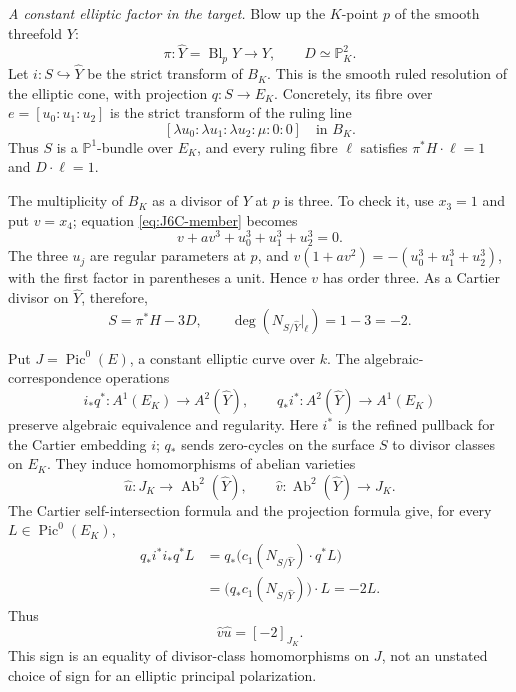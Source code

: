 \emph{A constant elliptic factor in the target.}
Blow up the $K$-point $p$ of the smooth threefold $Y$:
\[
 \pi:\widehat Y=\operatorname{Bl}_pY\longrightarrow Y,
 \qquad D\simeq\mathbb P^2_K.
\]
Let $i:S\hookrightarrow\widehat Y$ be the strict transform
of $B_K$. This is the smooth ruled resolution of the
elliptic cone, with projection $q:S\to E_K$. Concretely,
its fibre over $e=[u_0:u_1:u_2]$ is the strict transform
of the ruling line
\[
 [\lambda u_0:\lambda u_1:\lambda u_2:\mu:0:0]
 \quad\text{in }B_K.
\]
Thus $S$ is a $\mathbb P^1$-bundle over $E_K$, and every
ruling fibre $\ell$ satisfies
$\pi^*H\cdot\ell=1$ and $D\cdot\ell=1$.

The multiplicity of $B_K$ as a divisor of $Y$ at $p$ is
three. To check it, use $x_3=1$ and put $v=x_4$; equation
\eqref{eq:J6C-member} becomes
\[
 v+a v^3+u_0^3+u_1^3+u_2^3=0.
\]
The three $u_j$ are regular parameters at $p$, and
$v(1+a v^2)=-(u_0^3+u_1^3+u_2^3)$, with the first factor
in parentheses a unit. Hence $v$ has order three. As a
Cartier divisor on $\widehat Y$, therefore,
\[
 S=\pi^*H-3D,
 \qquad
 \deg(N_{S/\widehat Y}|_\ell)=1-3=-2.
\]

Put $J=\operatorname{Pic}^0(E)$, a constant elliptic
curve over $k$. The algebraic-correspondence operations
\[
 i_*q^*:A^1(E_K)\longrightarrow A^2(\widehat Y),\qquad
 q_*i^*:A^2(\widehat Y)\longrightarrow A^1(E_K)
\]
preserve algebraic equivalence and regularity. Here $i^*$
is the refined pullback for the Cartier embedding $i$;
$q_*$ sends zero-cycles on the surface $S$ to divisor
classes on $E_K$. They induce homomorphisms of abelian
varieties
\[
 \widehat u:J_K\longrightarrow\operatorname{Ab}^2(\widehat Y),
 \qquad
 \widehat v:\operatorname{Ab}^2(\widehat Y)\longrightarrow J_K.
\]
The Cartier self-intersection formula
\cite[Definition 42.29.1(1)(b)]{DGJ_StacksGysin}
and the projection formula
\cite[Lemma 42.26.4]{DGJ_StacksProjection} give,
for every $L\in\operatorname{Pic}^0(E_K)$,
\begin{align*}
 q_*i^*i_*q^*L
 &=q_*\bigl(c_1(N_{S/\widehat Y})\cdot q^*L\bigr)\\
 &=\bigl(q_*c_1(N_{S/\widehat Y})\bigr)\cdot L=-2L.
\end{align*}
Thus
\begin{equation}\label{eq:J6C-minus-two}
 \widehat v\widehat u=[-2]_{J_K}.
\end{equation}
This sign is an equality of divisor-class homomorphisms
on $J$, not an unstated choice of sign for an elliptic
principal polarization.

